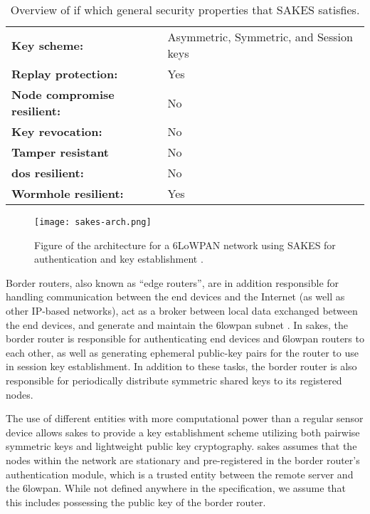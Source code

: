 \begin{table}[h]
\centering
\begin{tabular}{|l|l|} \hline
\textbf{Key scheme:} & Asymmetric, Symmetric, and Session keys  \\
\textbf{Replay protection:}	 & Yes  \\
\textbf{Node compromise resilient:} & No  \\
\textbf{Key revocation:} & No \\
\textbf{Tamper resistant} & No \\
\textbf{\gls{dos} resilient:} & No \\
\textbf{Wormhole resilient:} & Yes \\ \hline
\end{tabular}
\caption{Overview of if which general security properties that SAKES satisfies.}
\label{tab:sakes-props}
\end{table}


\begin{figure}[h]
	\centering
	\texttt{[image: sakes-arch.png]}
	\caption[Figure of the architecture for a 6LoWPAN network using SAKES for authentication and key establishment.]{Figure of the architecture for a 6LoWPAN network using SAKES for authentication and key establishment \cite{hussen2013sakes}.}
	\label{fig:sakes-arch}
\end{figure}


Border routers, also known as ``edge routers'', are in addition responsible for handling communication between the end devices and the Internet (as well as other IP-based networks), act as a broker between local data exchanged between the end devices, and generate and maintain the \gls{6lowpan} subnet \cite{olsson20146lowpan}. In \gls{sakes}, the border router is responsible for authenticating end devices and \gls{6lowpan} routers to each other, as well as generating ephemeral public-key pairs for the router to use in session key establishment. In addition to these tasks, the border router is also responsible for periodically distribute symmetric shared keys to its registered nodes.

The use of different entities with more computational power than a regular sensor device allows \gls{sakes} to provide a key establishment scheme utilizing both pairwise symmetric keys and lightweight public key cryptography. \gls{sakes} assumes that the nodes within the network are stationary and pre-registered in the border router's authentication module, which is a trusted entity between the remote server and the \gls{6lowpan}. While not defined anywhere in the specification, we assume that this includes possessing the public key of the border router. 

